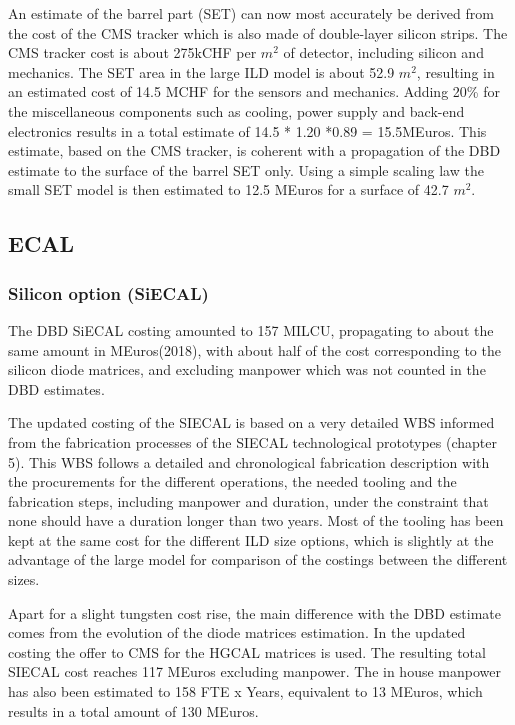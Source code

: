 An estimate of the barrel part (SET) can now most accurately be derived from the cost of the CMS tracker which is also made of double-layer silicon strips. The CMS tracker cost is about 275kCHF per $m^2$ of detector, including silicon and mechanics. The SET area in the large ILD model is about 52.9 $m^2$, resulting in an estimated cost of 14.5 MCHF for the sensors and mechanics. Adding 20\% for the miscellaneous components such as cooling, power supply and back-end electronics results in a total estimate of 14.5 * 1.20 *0.89 = 15.5MEuros. This estimate, based on the CMS tracker, is coherent with a propagation of the DBD estimate to the surface of the barrel SET only. Using a simple scaling law the small SET model is then estimated to 12.5 MEuros for a surface of 42.7 $m^2$. 



\subsection{ECAL}
\subsubsection{Silicon option (SiECAL)}
The DBD SiECAL costing amounted to 157 MILCU, propagating to about the same amount in MEuros(2018), with about half of the cost corresponding to the silicon diode matrices, and excluding manpower which was not counted in the DBD estimates.

The updated costing of the SIECAL is based on a very detailed WBS informed from the fabrication processes of the SIECAL technological prototypes (chapter 5). This WBS follows a detailed and chronological fabrication description with the procurements for the different operations, the needed tooling and the fabrication steps, including manpower and duration, under the constraint that none should have a duration longer than two years. Most of the tooling has been kept at the same cost for the different ILD size options, which is slightly at the advantage of the large model for comparison of the costings between the different sizes.

Apart for a slight tungsten cost rise, the main difference with the DBD estimate comes from the evolution of the diode matrices estimation. In the updated costing the offer to CMS for the HGCAL matrices is used. The resulting total SIECAL cost reaches 117 MEuros excluding manpower. The in house manpower has also been estimated to 158 FTE x Years, equivalent to 13 MEuros, which results in a total amount of 130 MEuros.

